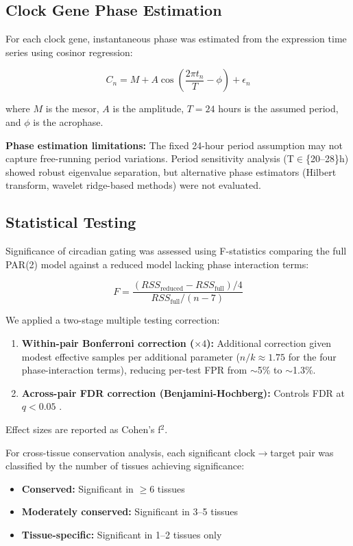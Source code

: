 \documentclass[11pt,letterpaper]{article}
\begin{document}
\subsection{Clock Gene Phase Estimation}

For each clock gene, instantaneous phase was estimated from the expression time series using cosinor regression:

\begin{equation}
C_n = M + A\cos\left(\frac{2\pi t_n}{T} - \phi\right) + \epsilon_n
\end{equation}

where $M$ is the mesor, $A$ is the amplitude, $T=24$ hours is the assumed period, and $\phi$ is the acrophase.

\textbf{Phase estimation limitations:} The fixed 24-hour period assumption may not capture free-running period variations. Period sensitivity analysis (T$\in$\{20--28\}h) showed robust eigenvalue separation, but alternative phase estimators (Hilbert transform, wavelet ridge-based methods) were not evaluated.

\subsection{Statistical Testing}

Significance of circadian gating was assessed using F-statistics comparing the full PAR(2) model against a reduced model lacking phase interaction terms:

\begin{equation}
F = \frac{(RSS_{\text{reduced}} - RSS_{\text{full}}) / 4}{RSS_{\text{full}} / (n - 7)}
\end{equation}

We applied a two-stage multiple testing correction:

\begin{enumerate}[noitemsep]
    \item \textbf{Within-pair Bonferroni correction ($\times 4$):} Additional correction given modest effective samples per additional parameter ($n/k \approx 1.75$ for the four phase-interaction terms), reducing per-test FPR from $\sim$5\% to $\sim$1.3\%.
    \item \textbf{Across-pair FDR correction (Benjamini-Hochberg):} Controls FDR at $q < 0.05$ \citep{benjamini1995}.
\end{enumerate}

Effect sizes are reported as Cohen's f$^2$.

For cross-tissue conservation analysis, each significant clock$\rightarrow$target pair was classified by the number of tissues achieving significance:
\begin{itemize}[noitemsep]
    \item \textbf{Conserved:} Significant in $\geq$6 tissues
    \item \textbf{Moderately conserved:} Significant in 3--5 tissues
    \item \textbf{Tissue-specific:} Significant in 1--2 tissues only
\end{itemize}
\end{document}
